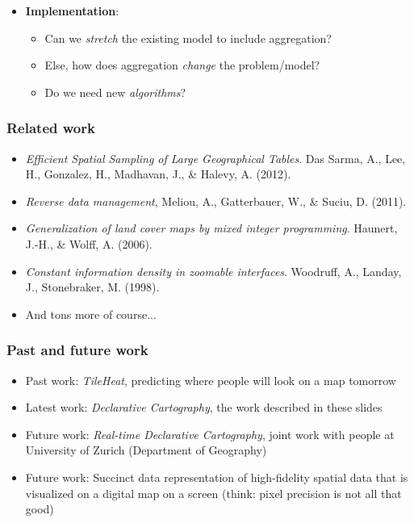 \documentclass{beamer}
\begin{document}
{\begin{itemize}
\begin{itemize}
d} aggregation, e.g. aggregation of non-geometric attributes?
  \item How should user \emph{parameterize} aggregation?
  \end{itemize}
  \item \textbf{Implementation}:
  \begin{itemize}
  \item Can we \emph{stretch} the existing model to include aggregation?
  \item Else, how does aggregation \emph{change} the problem/model?
  \item Do we need new \emph{algorithms}?
  \end{itemize}
  \end{itemize}

  \begin{center}
  \end{center}

}



\frame
{
  \frametitle{Related work}

  \begin{itemize}
  \item \emph{Efficient Spatial Sampling of Large Geographical Tables}. Das Sarma, A., Lee, H., Gonzalez, H., Madhavan, J., \& Halevy, A. (2012).
  \item \emph{Reverse data management}, Meliou, A., Gatterbauer, W., \& Suciu, D. (2011).
  \item \emph{Generalization of land cover maps by mixed integer programming}. Haunert, J.-H., \& Wolff, A. (2006). 
  \item \emph{Constant information density in zoomable interfaces}. Woodruff, A., Landay, J., Stonebraker, M. (1998).
  \item And tons more of course...
  \end{itemize}
}

\frame
{
  \frametitle{Past and future work}

  \begin{itemize}
  \item Past work: \emph{TileHeat}, predicting where people will look on a map tomorrow
  \item Latest work: \emph{Declarative Cartography}, the work described in these slides
  \item Future work: \emph{Real-time Declarative Cartography}, joint work with people at University of Zurich (Department of Geography)
  \item Future work: Succinct data representation of high-fidelity spatial data that is visualized on a digital map on a screen (think: pixel precision is not all that good)
  \end{itemize}
}
\end{document}
